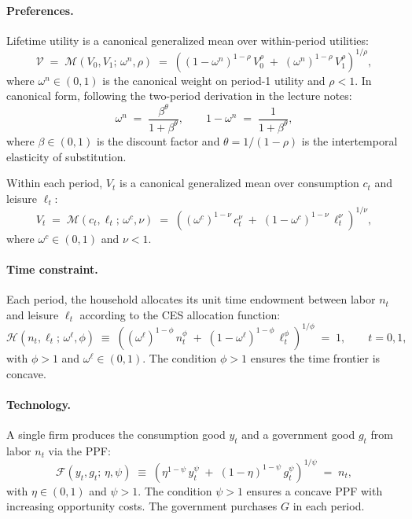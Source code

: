 \paragraph{Preferences.}
Lifetime utility is a canonical generalized mean over within-period utilities:
%
\begin{equation}
    \mathcal{V} \;=\; \mathcal{M}(V_0, V_1;\, \omega^n, \rho)
    \;=\; \left( (1-\omega^n)^{1-\rho}\, V_0^{\rho}
           \;+\; (\omega^n)^{1-\rho}\, V_1^{\rho} \right)^{1/\rho},
    \label{eq:lifetime}
\end{equation}
%
where $\omega^n \in (0,1)$ is the canonical weight on period-1 utility and $\rho < 1$. In canonical form, following the two-period derivation in the lecture notes:
%
\begin{equation}
    \omega^n \;=\; \frac{\beta^{\theta}}{1 + \beta^{\theta}},
    \qquad
    1 - \omega^n \;=\; \frac{1}{1 + \beta^{\theta}},
    \label{eq:omega-n}
\end{equation}
%
where $\beta \in (0,1)$ is the discount factor and $\theta = 1/(1-\rho)$ is the intertemporal elasticity of substitution.
 
Within each period, $V_t$ is a canonical generalized mean over consumption $c_t$ and leisure $\ell_t$:
%
\begin{equation}
    V_t \;=\; \mathcal{M}(c_t, \ell_t;\, \omega^c, \nu)
    \;=\; \left( (\omega^c)^{1-\nu}\, c_t^{\nu}
           \;+\; (1-\omega^c)^{1-\nu}\, \ell_t^{\nu} \right)^{1/\nu},
    \label{eq:Vt}
\end{equation}
%
where $\omega^c \in (0,1)$ and $\nu < 1$.
 
\paragraph{Time constraint.}
Each period, the household allocates its unit time endowment between labor $n_t$ and leisure $\ell_t$ according to the CES allocation function:
%
\begin{equation}
    \mathcal{H}(n_t, \ell_t;\, \omega^\ell, \phi)
    \;\equiv\;
    \left( (\omega^\ell)^{1-\phi}\, n_t^{\phi}
    \;+\; (1-\omega^\ell)^{1-\phi}\, \ell_t^{\phi} \right)^{1/\phi}
    \;=\; 1,
    \qquad t = 0, 1,
    \label{eq:time}
\end{equation}
%
with $\phi > 1$ and $\omega^\ell \in (0,1)$. The condition $\phi > 1$ ensures the time frontier is concave.
 
\paragraph{Technology.}
A single firm produces the consumption good $y_t$ and a government good $g_t$ from labor $n_t$ via the PPF:
%
\begin{equation}
    \mathcal{F}(y_t, g_t;\, \eta, \psi)
    \;\equiv\;
    \left( \eta^{1-\psi}\, y_t^{\psi}
    \;+\; (1-\eta)^{1-\psi}\, g_t^{\psi} \right)^{1/\psi}
    \;=\; n_t,
    \label{eq:tech}
\end{equation}
%
with $\eta \in (0,1)$ and $\psi > 1$. The condition $\psi > 1$ ensures a concave PPF with increasing opportunity costs. The government purchases $G$ in each period.
 
